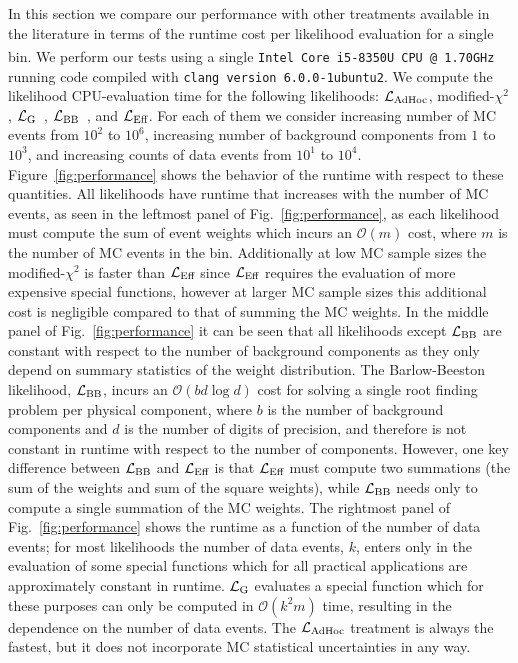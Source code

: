 In this section we compare our performance with other treatments available in the literature in terms of the runtime cost per likelihood evaluation for a single bin. We perform our tests using a single \texttt{Intel\textsuperscript{\textregistered} Core\texttrademark{} i5-8350U CPU @ 1.70GHz} running code compiled with \texttt{clang version 6.0.0-1ubuntu2}. We compute the likelihood CPU-evaluation time for the following likelihoods: $\mathcal{L}_{\textmd{AdHoc}}$, modified-$\chi^2$, $\mathcal{L}_\textmd{G}$~\cite{Glusenkamp:2017rlp}, $\mathcal{L}_{\textmd{BB}}$~\cite{Barlow:1993dm}, and $\mathcal{L}_\textmd{Eff}$. For each of them we consider increasing number of MC events from $10^2$ to $10^6$, increasing number of background components from $1$ to $10^3$, and increasing counts of data events from $10^1$ to $10^4$. Figure~\ref{fig:performance} shows the behavior of the runtime with respect to these quantities. All likelihoods have runtime that increases with the number of MC events, as seen in the leftmost panel of Fig.~\ref{fig:performance}, as each likelihood must compute the sum of event weights which incurs an $\mathcal{O}(m)$ cost, where $m$ is the number of MC events in the bin. Additionally at low MC sample sizes the modified-$\chi^2$ is faster than $\mathcal{L}_\textmd{Eff}$ since $\mathcal{L}_\textmd{Eff}$ requires the evaluation of more expensive special functions, however at larger MC sample sizes this additional cost is negligible compared to that of summing the MC weights. In the middle panel of Fig.~\ref{fig:performance} it can be seen that all likelihoods except $\mathcal{L}_{\textmd{BB}}$ are constant with respect to the number of background components as they only depend on summary statistics of the weight distribution. The Barlow-Beeston likelihood, $\mathcal{L}_{\textmd{BB}}$, incurs an $\mathcal{O}(b d \log d)$ cost for solving a single root finding problem per physical component, where $b$ is the number of background components and $d$ is the number of digits of precision, and therefore is not constant in runtime with respect to the number of components. However, one key difference between $\mathcal{L}_{\textmd{BB}}$ and $\mathcal{L}_\textmd{Eff}$ is that $\mathcal{L}_\textmd{Eff}$ must compute two summations (the sum of the weights and sum of the square weights), while $\mathcal{L}_{\textmd{BB}}$ needs only to compute a single summation of the MC weights. The rightmost panel of Fig.~\ref{fig:performance} shows the runtime as a function of the number of data events; for most likelihoods the number of data events, $k$, enters only in the evaluation of some special functions which for all practical applications are approximately constant in runtime. $\mathcal{L}_\textmd{G}$ evaluates a special function which for these purposes can only be computed in $\mathcal{O}(k^2 m)$ time, resulting in the dependence on the number of data events.
The $\mathcal{L}_{\textmd{AdHoc}}$ treatment is always the fastest, but it does not incorporate MC statistical uncertainties in any way.  

